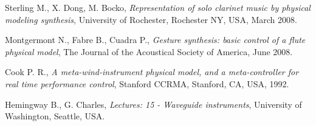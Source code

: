 \documentclass[nostrict]{szablonPG}
\begin{document}
\begin{thebibliography}{20}
		Sterling M., X. Dong, M. Bocko, \emph{Representation of solo clarinet music by physical modeling synthesis}, University of Rochester, Rochester NY, USA, March 2008.
		
		Montgermont N., Fabre B., Cuadra P., \emph{Gesture synthesis: basic control of a flute physical model}, The Journal of the Acoustical Society of America, June 2008.
		
		Cook P. R., \emph{A meta-wind-instrument physical model, and a meta-controller for real time performance control}, Stanford CCRMA, Stanford, CA, USA, 1992.
		
		Hemingway B., G. Charles, \emph{Lectures: 15 - Waveguide instruments}, University of Washington, Seattle, USA.
	\end{thebibliography}
	
\end{document}
